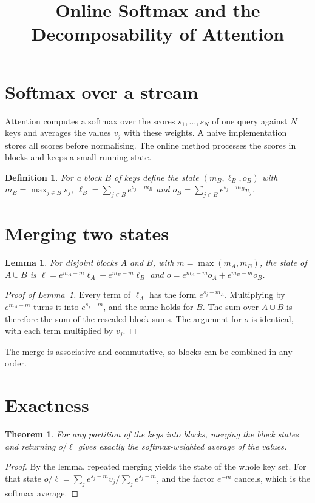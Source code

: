 \documentclass{article}
\title{Online Softmax and the Decomposability of Attention}
\newtheorem{lemma}{Lemma}
\newtheorem{theorem}{Theorem}
\newtheorem{definition}{Definition}
\begin{document}
\maketitle

\section{Softmax over a stream}
Attention computes a softmax over the scores $s_1, \dots, s_N$ of one query against $N$ keys and averages the values $v_j$ with these weights.
A naive implementation stores all scores before normalising. The online method processes the scores in blocks and keeps a small running state.

\begin{definition}
For a block $B$ of keys define the state $(m_B, \ell_B, o_B)$ with $m_B = \max_{j \in B} s_j$, $\ell_B = \sum_{j \in B} e^{s_j - m_B}$ and $o_B = \sum_{j \in B} e^{s_j - m_B} v_j$.
\end{definition}


\section{Merging two states}
\begin{lemma}\label{lem:merge}
For disjoint blocks $A$ and $B$, with $m = \max(m_A, m_B)$, the state of $A \cup B$ is
$\ell = e^{m_A - m}\ell_A + e^{m_B - m}\ell_B$ and $o = e^{m_A - m} o_A + e^{m_B - m} o_B$.
\end{lemma}
\begin{proof}[Proof of Lemma~\ref{lem:merge}]
Every term of $\ell_A$ has the form $e^{s_j - m_A}$. Multiplying by $e^{m_A - m}$ turns it into $e^{s_j - m}$, and the same holds for $B$.
The sum over $A \cup B$ is therefore the sum of the rescaled block sums. The argument for $o$ is identical, with each term multiplied by $v_j$.
\end{proof}

The merge is associative and commutative, so blocks can be combined in any order.

\section{Exactness}
\begin{theorem}
For any partition of the keys into blocks, merging the block states and returning $o / \ell$ gives exactly the softmax-weighted average of the values.
\end{theorem}
\begin{proof}
By the lemma, repeated merging yields the state of the whole key set.
For that state $o / \ell = \sum_j e^{s_j - m} v_j / \sum_j e^{s_j - m}$, and the factor $e^{-m}$ cancels, which is the softmax average.
\end{proof}
\end{document}

